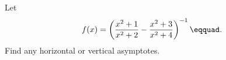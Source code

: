 Let
\begin{equation*}
  f(x) = \left(\frac{x^2+1}{x^2+2}-\frac{x^2+3}{x^2+4}\right)^{-1} 
\eqquad.
\end{equation*}
Find any horizontal or vertical asymptotes.

